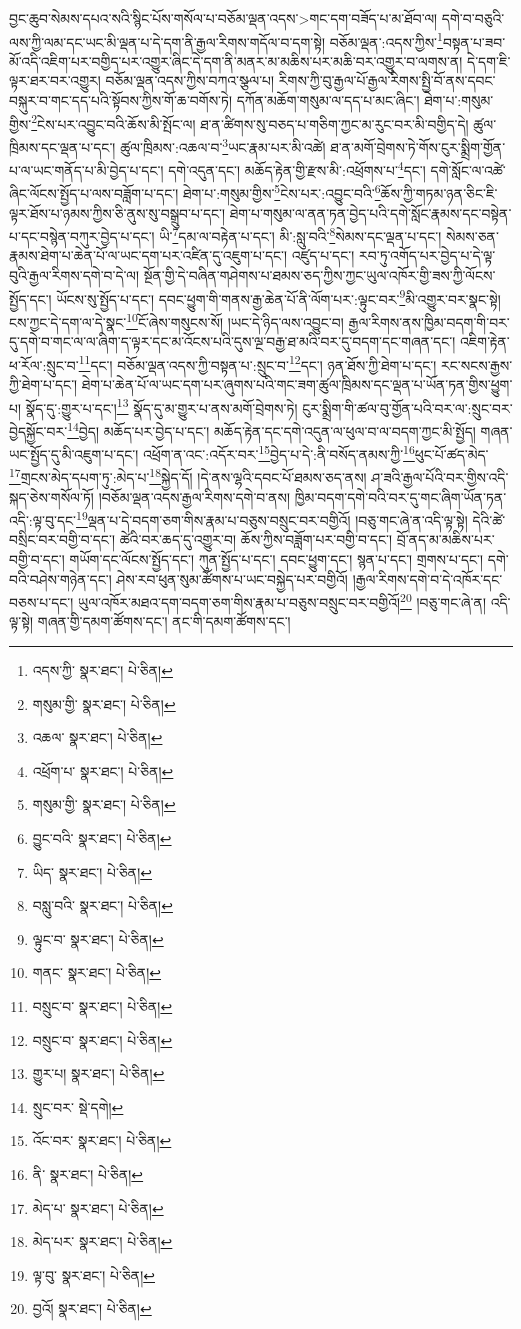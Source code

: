 བྱང་ཆུབ་སེམས་དཔའ་སའི་སྙིང་པོས་གསོལ་པ་བཅོམ་ལྡན་འདས་>གང་དག་བཟོད་པ་མ་ཐོབ་ལ། དགེ་བ་བཅུའི་ལས་ཀྱི་ལམ་དང་ཡང་མི་ལྡན་པ་དེ་དག་ནི་རྒྱལ་རིགས་གདོལ་བ་དག་སྟེ། བཅོམ་ལྡན་:འདས་ཀྱིས་\footnote{འདས་ཀྱི་  སྣར་ཐང་།  པེ་ཅིན། }བསྟན་པ་ཟབ་མོ་འདི་འཇིག་པར་བགྱིད་པར་འགྱུར་ཞིང་དེ་དག་ནི་མནར་མ་མཆིས་པར་མཆི་བར་འགྱུར་བ་ལགས་ན། དེ་དག་ཇི་ལྟར་ཐར་བར་འགྱུར། བཅོམ་ལྡན་འདས་ཀྱིས་བཀའ་སྩལ་པ། རིགས་ཀྱི་བུ་རྒྱལ་པོ་རྒྱལ་རིགས་སྤྱི་བོ་ནས་དབང་བསྐུར་བ་གང་དད་པའི་སྟོབས་ཀྱིས་གོ་ཆ་བགོས་ཏེ། དཀོན་མཆོག་གསུམ་ལ་དད་པ་མང་ཞིང་། ཐེག་པ་:གསུམ་གྱིས་\footnote{གསུམ་གྱི་  སྣར་ཐང་།  པེ་ཅིན། }ངེས་པར་འབྱུང་བའི་ཆོས་མི་སྤོང་ལ། ཐ་ན་ཚིགས་སུ་བཅད་པ་གཅིག་ཀྱང་མ་རུང་བར་མི་བགྱིད་དེ། ཚུལ་ཁྲིམས་དང་ལྡན་པ་དང་། ཚུལ་ཁྲིམས་:འཆལ་བ་\footnote{འཆལ་  སྣར་ཐང་།  པེ་ཅིན། }ཡང་རྣམ་པར་མི་འཚེ། ཐ་ན་མགོ་བྲེགས་ཏེ་གོས་ངུར་སྨྲིག་གྱོན་པ་ལ་ཡང་གནོད་པ་མི་བྱེད་པ་དང་། དགེ་འདུན་དང་། མཆོད་རྟེན་གྱི་རྫས་མི་:འཕྲོགས་པ་\footnote{འཕྲོག་པ་  སྣར་ཐང་།  པེ་ཅིན། }དང་། དགེ་སློང་ལ་འཚེ་ཞིང་ལོངས་སྤྱོད་པ་ལས་བཟློག་པ་དང་། ཐེག་པ་:གསུམ་གྱིས་\footnote{གསུམ་གྱི་  སྣར་ཐང་།  པེ་ཅིན། }ངེས་པར་:འབྱུང་བའི་\footnote{བྱུང་བའི་  སྣར་ཐང་།  པེ་ཅིན། }ཆོས་ཀྱི་གཏམ་ཉན་ཅིང་ཇི་ལྟར་ཐོས་པ་ཉམས་ཀྱིས་ཅི་ནུས་སུ་བསྒྲུབ་པ་དང་། ཐེག་པ་གསུམ་ལ་ནན་ཏན་བྱེད་པའི་དགེ་སློང་རྣམས་དང་བསྟེན་པ་དང་བསྙེན་བཀུར་བྱེད་པ་དང་། ཡི་\footnote{ཡིད་  སྣར་ཐང་།  པེ་ཅིན། }དམ་ལ་བརྟེན་པ་དང་། མི་:སླུ་བའི་\footnote{བསླུ་བའི་  སྣར་ཐང་།  པེ་ཅིན། }སེམས་དང་ལྡན་པ་དང་། སེམས་ཅན་རྣམས་ཐེག་པ་ཆེན་པོ་ལ་ཡང་དག་པར་འཛིན་དུ་འཇུག་པ་དང་། འཛུད་པ་དང་། རབ་ཏུ་འགོད་པར་བྱེད་པ་དེ་ལྟ་བུའི་རྒྱལ་རིགས་དགེ་བ་དེ་ལ། སྔོན་གྱི་དེ་བཞིན་གཤེགས་པ་ཐམས་ཅད་ཀྱིས་ཀྱང་ཡུལ་འཁོར་གྱི་ཟས་ཀྱི་ལོངས་སྤྱོད་དང་། ཡོངས་སུ་སྤྱོད་པ་དང་། དབང་ཕྱུག་གི་གནས་རྒྱ་ཆེན་པོ་ནི་ལོག་པར་:ལྟུང་བར་\footnote{ལྟུང་བ་  སྣར་ཐང་།  པེ་ཅིན། }མི་འགྱུར་བར་སྣང་སྟེ། ངས་ཀྱང་དེ་དག་ལ་དེ་སྣང་\footnote{གནང་  སྣར་ཐང་།  པེ་ཅིན། }ངོ་ཞེས་གསུངས་སོ། །ཡང་དེ་ཉིད་ལས་འབྱུང་བ། རྒྱལ་རིགས་ནས་ཁྱིམ་བདག་གི་བར་དུ་དགེ་བ་གང་ལ་ལ་ཞིག་ད་ལྟར་དང་མ་འོངས་པའི་དུས་ལྔ་བརྒྱ་ཐ་མའི་བར་དུ་བདག་དང་གཞན་དང་། འཇིག་རྟེན་ཕ་རོལ་:སྲུང་བ་\footnote{བསྲུང་བ་  སྣར་ཐང་།  པེ་ཅིན། }དང་། བཅོམ་ལྡན་འདས་ཀྱི་བསྟན་པ་:སྲུང་བ་\footnote{བསྲུང་བ་  སྣར་ཐང་།  པེ་ཅིན། }དང་། ཉན་ཐོས་ཀྱི་ཐེག་པ་དང་། རང་སངས་རྒྱས་ཀྱི་ཐེག་པ་དང་། ཐེག་པ་ཆེན་པོ་ལ་ཡང་དག་པར་ཞུགས་པའི་གང་ཟག་ཚུལ་ཁྲིམས་དང་ལྡན་པ་ཡོན་ཏན་གྱིས་ཕྱུག་པ། སྣོད་དུ་:གྱུར་པ་དང་།\footnote{གྱུར་པ།  སྣར་ཐང་།  པེ་ཅིན། } སྣོད་དུ་མ་གྱུར་པ་ནས་མགོ་བྲེགས་ཏེ། ངུར་སྨྲིག་གི་ཚལ་བུ་གྱོན་པའི་བར་ལ་:སྲུང་བར་བྱེདསྐྱོང་བར་\footnote{སྲུང་བར་  སྡེ་དགེ། }བྱེད། མཆོད་པར་བྱེད་པ་དང་། མཆོད་རྟེན་དང་དགེ་འདུན་ལ་ཕུལ་བ་ལ་བདག་ཀྱང་མི་སྤྱོད། གཞན་ཡང་སྤྱོད་དུ་མི་འཇུག་པ་དང་། འཕྲོག་ན་འང་:འདོར་བར་\footnote{འོང་བར་  སྣར་ཐང་།  པེ་ཅིན། }བྱེད་པ་དེ་:ནི་བསོད་ནམས་ཀྱི་\footnote{ནི་  སྣར་ཐང་།  པེ་ཅིན། }ཕུང་པོ་ཚད་མེད་\footnote{མེད་པ་  སྣར་ཐང་།  པེ་ཅིན། }གྲངས་མེད་དཔག་ཏུ་:མེད་པ་\footnote{མེད་པར་  སྣར་ཐང་།  པེ་ཅིན། }སྐྱེད་དོ། །དེ་ནས་ལྷའི་དབང་པོ་ཐམས་ཅད་ནས། ཤ་ཟའི་རྒྱལ་པོའི་བར་གྱིས་འདི་སྐད་ཅེས་གསོལ་ཏོ། །བཅོམ་ལྡན་འདས་རྒྱལ་རིགས་དགེ་བ་ནས། ཁྱིམ་བདག་དགེ་བའི་བར་དུ་གང་ཞིག་ཡོན་ཏན་འདི་:ལྟ་བུ་དང་\footnote{ལྟ་བུ་  སྣར་ཐང་།  པེ་ཅིན། }ལྡན་པ་དེ་བདག་ཅག་གིས་རྣམ་པ་བཅུས་བསྲུང་བར་བགྱིའོ། །བཅུ་གང་ཞེ་ན་འདི་ལྟ་སྟེ། དེའི་ཚེ་བསྲིང་བར་བགྱི་བ་དང་། ཚེའི་བར་ཆད་དུ་འགྱུར་བ། ཆོས་ཀྱིས་བཟློག་པར་བགྱི་བ་དང་། བྲོ་ནད་མ་མཆིས་པར་བགྱི་བ་དང་། གཡོག་དང་ལོངས་སྤྱོད་དང་། ཀུན་སྤྱོད་པ་དང་། དབང་ཕྱུག་དང་། སྙན་པ་དང་། གྲགས་པ་དང་། དགེ་བའི་བཤེས་གཉེན་དང་། ཤེས་རབ་ཕུན་སུམ་ཚོགས་པ་ཡང་བསྐྱེད་པར་བགྱིའོ། །རྒྱལ་རིགས་དགེ་བ་དེ་འཁོར་དང་བཅས་པ་དང་། ཡུལ་འཁོར་མཐའ་དག་བདག་ཅག་གིས་རྣམ་པ་བཅུས་བསྲུང་བར་བགྱིའོ།\footnote{བྱའོ།  སྣར་ཐང་།  པེ་ཅིན། } །བཅུ་གང་ཞེ་ན། འདི་ལྟ་སྟེ། གཞན་གྱི་དམག་ཚོགས་དང་། ནང་གི་དམག་ཚོགས་དང་། 